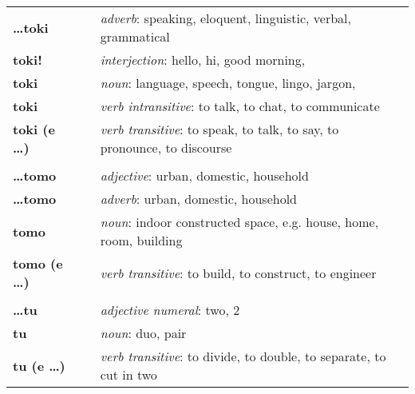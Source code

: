 \begin{supertabular}{p{2,5cm}|ll}
    \textbf{\dots toki}          &  & \textit{adverb}: speaking, eloquent, linguistic, verbal, grammatical                                       \\
    \textbf{toki!}               &  & \textit{interjection}: hello, hi, good morning,                                                            \\
    \textbf{toki}                &  & \textit{noun}: language, speech, tongue, lingo, jargon,                                                    \\
    \textbf{toki}                &  & \textit{verb intransitive}: to talk, to chat, to communicate                                               \\
    \textbf{toki (e \dots)}      &  & \textit{verb transitive}: to speak, to talk, to say, to pronounce, to discourse                            \\
                                 &  &                                                                                                            \\ %
    \textbf{\dots tomo}          &  & \textit{adjective}: urban, domestic, household                                                             \\
    \textbf{\dots tomo}          &  & \textit{adverb}: urban, domestic, household                                                                \\
    \textbf{tomo}                &  & \textit{noun}: indoor constructed space, e.g. house, home, room, building                                  \\
    \textbf{tomo (e \dots)}      &  & \textit{verb transitive}: to build, to construct, to engineer                                              \\
                                 &  &                                                                                                            \\ %
    \textbf{\dots tu}            &  & \textit{adjective numeral}: two, 2                                                                         \\
    \textbf{tu}                  &  & \textit{noun}: duo, pair                                                                                   \\
    \textbf{tu (e \dots)}        &  & \textit{verb transitive}: to divide, to double, to separate, to cut in two                                 \\

\end{supertabular}
